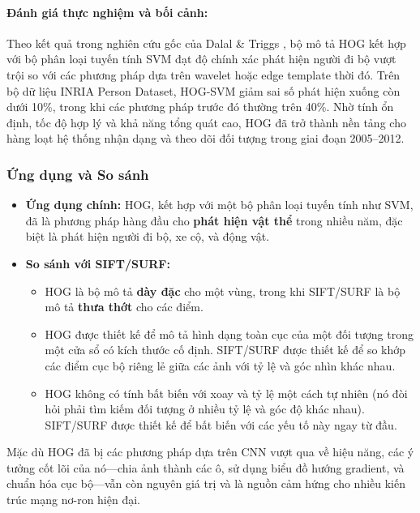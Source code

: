 \paragraph{Đánh giá thực nghiệm và bối cảnh:}
Theo kết quả trong nghiên cứu gốc của Dalal \& Triggs \cite{Dalal2005}, 
bộ mô tả HOG kết hợp với bộ phân loại tuyến tính SVM đạt độ chính xác phát hiện người đi bộ vượt trội so với các phương pháp dựa trên wavelet hoặc edge template thời đó. 
Trên bộ dữ liệu INRIA Person Dataset, HOG-SVM giảm sai số phát hiện xuống còn dưới 10\%, trong khi các phương pháp trước đó thường trên 40\%. 
Nhờ tính ổn định, tốc độ hợp lý và khả năng tổng quát cao, HOG đã trở thành nền tảng cho hàng loạt hệ thống nhận dạng và theo dõi đối tượng trong giai đoạn 2005–2012.

\subsubsection{Ứng dụng và So sánh}
\label{subsubsec:hog_applications}
\begin{itemize}
    \item \textbf{Ứng dụng chính:} HOG, kết hợp với một bộ phân loại tuyến tính như SVM, đã là phương pháp hàng đầu cho \textbf{phát hiện vật thể} trong nhiều năm, đặc biệt là phát hiện người đi bộ, xe cộ, và động vật.
    \item \textbf{So sánh với SIFT/SURF:}
        \begin{itemize}
            \item HOG là bộ mô tả \textbf{dày đặc} cho một vùng, trong khi SIFT/SURF là bộ mô tả \textbf{thưa thớt} cho các điểm.
            \item HOG được thiết kế để mô tả hình dạng toàn cục của một đối tượng trong một cửa sổ có kích thước cố định. SIFT/SURF được thiết kế để so khớp các điểm cục bộ riêng lẻ giữa các ảnh với tỷ lệ và góc nhìn khác nhau.
            \item HOG không có tính bất biến với xoay và tỷ lệ một cách tự nhiên (nó đòi hỏi phải tìm kiếm đối tượng ở nhiều tỷ lệ và góc độ khác nhau). SIFT/SURF được thiết kế để bất biến với các yếu tố này ngay từ đầu.
        \end{itemize}
\end{itemize}
Mặc dù HOG đã bị các phương pháp dựa trên CNN vượt qua về hiệu năng, các ý tưởng cốt lõi của nó—chia ảnh thành các ô, sử dụng biểu đồ hướng gradient, và chuẩn hóa cục bộ—vẫn còn nguyên giá trị và là nguồn cảm hứng cho nhiều kiến trúc mạng nơ-ron hiện đại.

